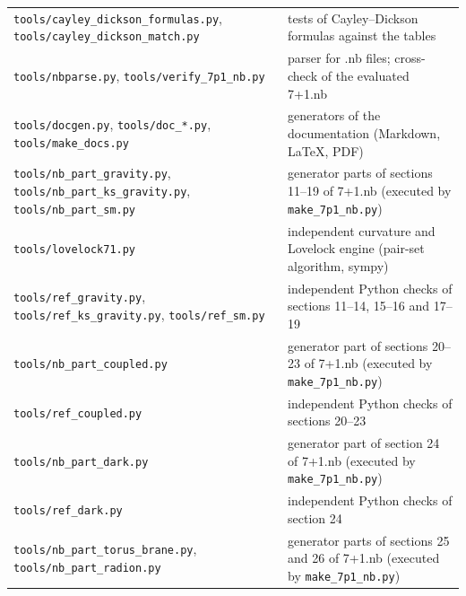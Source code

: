 \documentclass[10pt,a4paper]{article}
\begin{document}
{\begin{longtable}{>{\raggedright\arraybackslash}p{}>{\raggedright\arraybackslash}p{}}
\texttt{tools/\allowbreak{}cayley\_\allowbreak{}dickson\_\allowbreak{}formulas.py}, \texttt{tools/\allowbreak{}cayley\_\allowbreak{}dickson\_\allowbreak{}match.py} & tests of Cayley–Dickson formulas against the tables \\
\texttt{tools/\allowbreak{}nbparse.py}, \texttt{tools/\allowbreak{}verify\_\allowbreak{}7p1\_\allowbreak{}nb.py} & parser for .nb files; cross-check of the evaluated 7+1.nb \\
\texttt{tools/\allowbreak{}docgen.py}, \texttt{tools/\allowbreak{}doc\_\allowbreak{}*.py}, \texttt{tools/\allowbreak{}make\_\allowbreak{}docs.py} & generators of the documentation (Markdown, LaTeX, PDF) \\
\texttt{tools/\allowbreak{}nb\_\allowbreak{}part\_\allowbreak{}gravity.py}, \texttt{tools/\allowbreak{}nb\_\allowbreak{}part\_\allowbreak{}ks\_\allowbreak{}gravity.py}, \texttt{tools/\allowbreak{}nb\_\allowbreak{}part\_\allowbreak{}sm.py} & generator parts of sections 11–19 of 7+1.nb (executed by \texttt{make\_\allowbreak{}7p1\_\allowbreak{}nb.py}) \\
\texttt{tools/\allowbreak{}lovelock71.py} & independent curvature and Lovelock engine (pair-set algorithm, sympy) \\
\texttt{tools/\allowbreak{}ref\_\allowbreak{}gravity.py}, \texttt{tools/\allowbreak{}ref\_\allowbreak{}ks\_\allowbreak{}gravity.py}, \texttt{tools/\allowbreak{}ref\_\allowbreak{}sm.py} & independent Python checks of sections 11–14, 15–16 and 17–19 \\
\texttt{tools/\allowbreak{}nb\_\allowbreak{}part\_\allowbreak{}coupled.py} & generator part of sections 20–23 of 7+1.nb (executed by \texttt{make\_\allowbreak{}7p1\_\allowbreak{}nb.py}) \\
\texttt{tools/\allowbreak{}ref\_\allowbreak{}coupled.py} & independent Python checks of sections 20–23 \\
\texttt{tools/\allowbreak{}nb\_\allowbreak{}part\_\allowbreak{}dark.py} & generator part of section 24 of 7+1.nb (executed by \texttt{make\_\allowbreak{}7p1\_\allowbreak{}nb.py}) \\
\texttt{tools/\allowbreak{}ref\_\allowbreak{}dark.py} & independent Python checks of section 24 \\
\texttt{tools/\allowbreak{}nb\_\allowbreak{}part\_\allowbreak{}torus\_\allowbreak{}brane.py}, \texttt{tools/\allowbreak{}nb\_\allowbreak{}part\_\allowbreak{}radion.py} & generator parts of sections 25 and 26 of 7+1.nb (executed by \texttt{make\_\allowbreak{}7p1\_\allowbreak{}nb.py}) \\

\end{longtable}}
\end{document}
